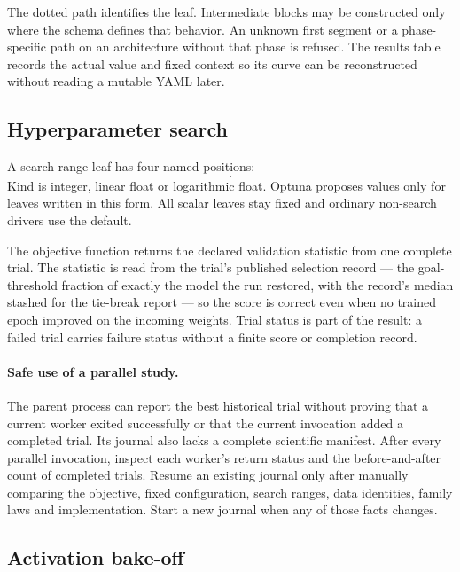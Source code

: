 \documentclass[10pt,aps,prd,twocolumn,nofootinbib]{revtex4-2}
\begin{document}
The dotted path identifies the leaf.  Intermediate blocks may be constructed
only where the schema defines that behavior.  An unknown first segment or a
phase-specific path on an architecture without that phase is refused.  The
results table records the actual value and fixed context so its curve can be
reconstructed without reading a mutable YAML later.

\subsection{Hyperparameter search}

A search-range leaf has four named positions:
\begin{equation*}
 [\text{default},\text{minimum},\text{maximum},\text{kind}].
\end{equation*}
Kind is integer, linear float or logarithmic float.  Optuna proposes values
only for leaves written in this form.  All scalar leaves stay fixed and
ordinary non-search drivers use the default.

The objective function returns the declared validation statistic from one
complete trial.  The statistic is read from the trial's published selection
record — the goal-threshold fraction of exactly the model the run restored,
with the record's median stashed for the tie-break report — so the score is
correct even when no trained epoch improved on the incoming weights.  Trial
status is part of the result: a failed trial carries failure status without
a finite score or completion record.

\paragraph{Safe use of a parallel study.}
The parent process can report the best historical trial without proving that a
current worker exited successfully or that the current invocation added a
completed trial.  Its journal also lacks a complete scientific manifest.
After every parallel invocation, inspect each worker's return status and the
before-and-after count of completed trials.  Resume an existing journal only
after manually comparing the objective, fixed configuration, search ranges,
data identities, family laws and implementation.  Start a new journal when
any of those facts changes.

\subsection{Activation bake-off}
\end{document}

